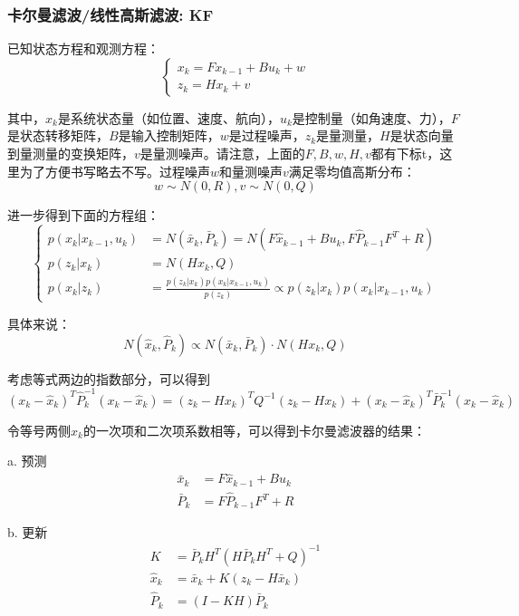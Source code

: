 \subsubsection{卡尔曼滤波/线性高斯滤波: KF}
已知状态方程和观测方程：
\begin{equation}
	\left\{
	\begin{array}{lr}
		x_k = F x_{k-1} + B u_k + w \\
		z_k = H x_k + v
	\end{array}
	\right.
\end{equation}
\par 其中，$x_k$是系统状态量（如位置、速度、航向），$u_k$是控制量（如角速度、力），$F$是状态转移矩阵，$B$是输入控制矩阵，$w$是过程噪声，$z_k$是量测量，$H$是状态向量到量测量的变换矩阵，$v$是量测噪声。请注意，上面的$F,B,w,H,v$都有下标t，这里为了方便书写略去不写。过程噪声$w$和量测噪声$v$满足零均值高斯分布：
\begin{equation}
	w \sim N(0,R),v \sim N(0,Q)
\end{equation}
\par 进一步得到下面的方程组：
\begin{equation}
	\left\{
	\begin{split}
		p(x_k|x_{k-1},u_k)
		&=N(\bar{x}_k,\bar{P}_k)
		=N(F \hat{x}_{k-1} + B u_k, F \hat{P}_{k-1} F^T + R) \\
		p(z_k|x_k) &=N(H x_k,Q) \\
		p(x_k|z_k) &= \frac{p(z_k|x_k)p(x_k|x_{k-1},u_k)}{p(z_k)} \propto p(z_k|x_k)p(x_k|x_{k-1},u_k)
	\end{split}
	\right.
\end{equation}
\par 具体来说：
\begin{equation}
	N(\hat{x}_k,\hat{P}_k) \propto N(\bar{x}_k,\bar{P}_k) \cdot N(H x_k,Q)
\end{equation}
\par 考虑等式两边的指数部分，可以得到
\begin{equation}
	(x_k-\hat{x}_k)^T\hat{P}_k^{-1}(x_k-\hat{x}_k)
	=
	(z_k-H x_k)^T Q^{-1} (z_k-H x_k)
	+
	(x_k-\hat{x}_k)^T \bar{P}_k^{-1} (x_k-\hat{x}_k)
\end{equation}
\par 令等号两侧$x_k$的一次项和二次项系数相等，可以得到卡尔曼滤波器的结果：
\par a. 预测
\begin{equation}
	\begin{split}
		\bar{x}_k&=F\hat{x}_{k-1} + B u_k \\
		\bar{P}_k&=F\hat{P}_{k-1}F^T+R
	\end{split}
\end{equation}
\par b. 更新
\begin{equation}
	\begin{split}
		K&=\bar{P}_k H^T(H \bar{P}_k H^T + Q)^{-1} \\
		\hat{x}_k&=\bar{x}_k+K(z_k-H \bar{x}_k) \\
		\hat{P}_k&=(I-K H)\bar{P}_k
	\end{split}
\end{equation}


